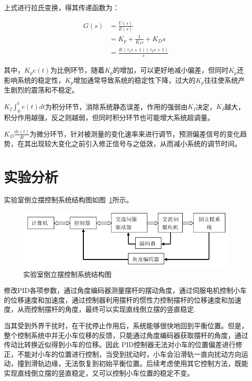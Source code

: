 上式进行拉氏变换，得其传递函数为：

\begin{equation}
\begin{aligned}
G(s)&=\frac{U(s)}{E(s)}\\
&=K_p+\frac{1}{K_Is}+K_Ds\\
&=\frac{K(\tau_1s+1)(\tau_2s+1)}{s}
\end{aligned}
\end{equation}

其中，$K_pe(t)$为比例环节，随着$K_p$的增加，可以更好地减小偏差，但同时$K_p$还影响系统的稳定性，$K_p$增加通常导致系统的稳定性下降，过大的$K_p$往往使系统产生剧烈的震荡和不稳定。

$K_I\int_0^te(t)dt$为积分环节，消除系统静态误差，作用的强弱由$K_I$决定，$K_I$越大，积分作用越强，反之则越弱，但同时积分环节也可能增大系统超调量。

$K_D\frac{de(t)}{dt}$为微分环节，针对被测量的变化速率来进行调节，预测偏差信号的变化趋势，在其出现较大变化之前引入修正信号与之低效，从而减小系统的调节时间。

\section{实验分析}

实验室倒立摆控制系统结构图如图~\ref{fig:structure}所示。

\begin{figure}[hbpt]
\centering
\includegraphics[width=12cm]{structure.png}
\caption{实验室倒立摆控制系统结构图}\label{fig:structure}
\end{figure}

修改PID各项参数，通过角度编码器测量摆杆的摆动角度，通过伺服电机控制小车的位移速度和加速度，通过控制器利用摆杆的惯性力控制摆杆的位移速度和加速度，从而控制摆杆的角度，最终可以实现直线倒立摆的竖直稳定.

当其受到外界干扰时，在干扰停止作用后，系统能够很快地回到平衡位置。但是，整个控制系统中并无小车位移的反馈，只能通过角度编码器获取摆杆的角度，通过传动比转换近似得到小车的位移。因此 PID控制器无法对小车的位置偏差进行修正，不能对小车的位置进行控制，当受到扰动时，小车会沿滑轨一直向扰动方向运动，撞到滑轨边缘，无法恢复到初始平衡位置。后续考虑使用其它控制方法，既能实现直线倒立摆的竖直稳定，又可以控制小车位置的稳定不变。

